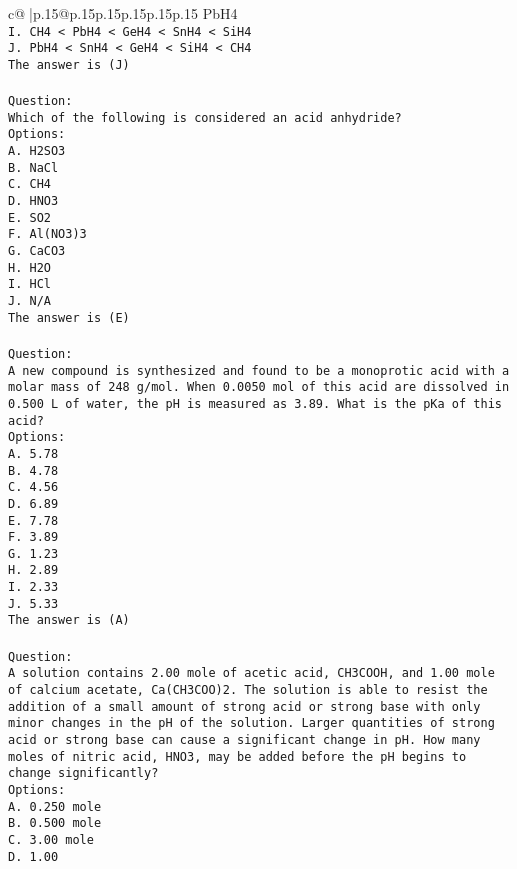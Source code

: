 \documentclass{article}
\begin{document}
{\begin{supertabular}{c@{$\;$}|p{.15\linewidth}@{}p{.15\linewidth}p{.15\linewidth}p{.15\linewidth}p{.15\linewidth}p{.15\linewidth}}
{{{PbH4\\ \tt I. CH4 < PbH4 < GeH4 < SnH4 < SiH4\\ \tt J. PbH4 < SnH4 < GeH4 < SiH4 < CH4\\ \tt The answer is (J)\\ \tt \\ \tt Question:\\ \tt Which of the following is considered an acid anhydride?\\ \tt Options:\\ \tt A. H2SO3\\ \tt B. NaCl\\ \tt C. CH4\\ \tt D. HNO3\\ \tt E. SO2\\ \tt F. Al(NO3)3\\ \tt G. CaCO3\\ \tt H. H2O\\ \tt I. HCl\\ \tt J. N/A\\ \tt The answer is (E)\\ \tt \\ \tt Question:\\ \tt A new compound is synthesized and found to be a monoprotic acid with a molar mass of 248 g/mol. When 0.0050 mol of this acid are dissolved in 0.500 L of water, the pH is measured as 3.89. What is the pKa of this acid?\\ \tt Options:\\ \tt A. 5.78\\ \tt B. 4.78\\ \tt C. 4.56\\ \tt D. 6.89\\ \tt E. 7.78\\ \tt F. 3.89\\ \tt G. 1.23\\ \tt H. 2.89\\ \tt I. 2.33\\ \tt J. 5.33\\ \tt The answer is (A)\\ \tt \\ \tt Question:\\ \tt A solution contains 2.00 mole of acetic acid, CH3COOH, and 1.00 mole of calcium acetate, Ca(CH3COO)2. The solution is able to resist the addition of a small amount of strong acid or strong base with only minor changes in the pH of the solution. Larger quantities of strong acid or strong base can cause a significant change in pH. How many moles of nitric acid, HNO3, may be added before the pH begins to change significantly?\\ \tt Options:\\ \tt A. 0.250 mole\\ \tt B. 0.500 mole\\ \tt C. 3.00 mole\\ \tt D. 1.00 }}}
\end{supertabular}}
\end{document}
